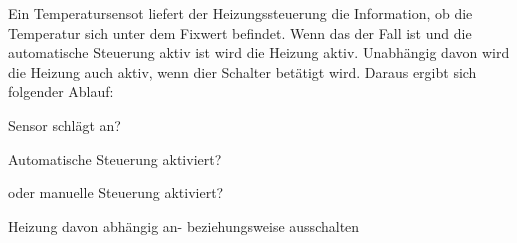 Ein Temperatursensot liefert der Heizungssteuerung die Information, ob die Temperatur sich unter dem Fixwert befindet. Wenn das der Fall ist und die automatische Steuerung aktiv ist wird die Heizung aktiv. Unabhängig davon wird die Heizung auch aktiv, wenn dier Schalter betätigt wird. Daraus ergibt sich folgender Ablauf:
\item{Sensor schlägt an?}
\item{Automatische Steuerung aktiviert?}
\item{oder manuelle Steuerung aktiviert?}
\item{Heizung davon abhängig an- beziehungsweise ausschalten}
